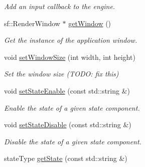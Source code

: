 \begin{DoxyCompactItemize}
\begin{DoxyCompactList}\small\item\em Add an input callback to the engine. \end{DoxyCompactList}\item 
\hypertarget{class_army_engine_a09eda82a3334bd614007671eca515593}{sf\-::\-Render\-Window $\ast$ \hyperlink{class_army_engine_a09eda82a3334bd614007671eca515593}{get\-Window} ()}\label{d4/d9d/class_army_engine_a09eda82a3334bd614007671eca515593}

\begin{DoxyCompactList}\small\item\em Get the instance of the application window. \end{DoxyCompactList}\item 
\hypertarget{class_army_engine_a2d5a28392e8d5491dde4107b3547564e}{void \hyperlink{class_army_engine_a2d5a28392e8d5491dde4107b3547564e}{set\-Window\-Size} (int width, int height)}\label{d4/d9d/class_army_engine_a2d5a28392e8d5491dde4107b3547564e}

\begin{DoxyCompactList}\small\item\em Set the window size (T\-O\-D\-O\-: fix this) \end{DoxyCompactList}\item 
\hypertarget{class_army_engine_aa388ae42a9751f22e3355930004f6e7e}{void \hyperlink{class_army_engine_aa388ae42a9751f22e3355930004f6e7e}{set\-State\-Enable} (const std\-::string \&)}\label{d4/d9d/class_army_engine_aa388ae42a9751f22e3355930004f6e7e}

\begin{DoxyCompactList}\small\item\em Enable the state of a given state component. \end{DoxyCompactList}\item 
\hypertarget{class_army_engine_a64defcec3593394c174be2685e85cd77}{void \hyperlink{class_army_engine_a64defcec3593394c174be2685e85cd77}{set\-State\-Disable} (const std\-::string \&)}\label{d4/d9d/class_army_engine_a64defcec3593394c174be2685e85cd77}

\begin{DoxyCompactList}\small\item\em Disable the state of a given state component. \end{DoxyCompactList}\item 
\hypertarget{class_army_engine_ab586311ec0530c494af4b93244ac8a2d}{state\-Type \hyperlink{class_army_engine_ab586311ec0530c494af4b93244ac8a2d}{get\-State} (const std\-::string \&)}\label{d4/d9d/class_army_engine_ab586311ec0530c494af4b93244ac8a2d}


\end{DoxyCompactItemize}
